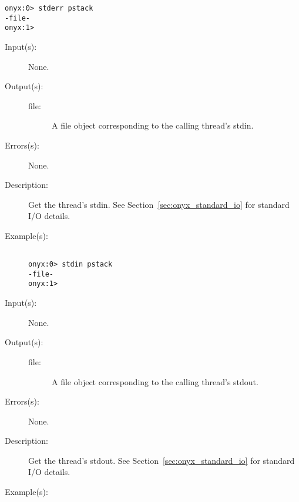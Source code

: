 \begin{description}
\begin{description}
\begin{verbatim}
onyx:0> stderr pstack
-file-
onyx:1>
		\end{verbatim}
	\end{description}
\label{systemdict:stdin}
\item[{\onyxop{--}{stdin}{file}}: ]
	\begin{description}\item[]
	\item[Input(s): ] None.
	\item[Output(s): ]
		\begin{description}\item[]
		\item[file: ]
			A file object corresponding to the calling thread's
			stdin.
		\end{description}
	\item[Errors(s): ] None.
	\item[Description: ]
		Get the thread's stdin.  See Section~\ref{sec:onyx_standard_io}
		for standard I/O details.
	\item[Example(s): ]\begin{verbatim}

onyx:0> stdin pstack
-file-
onyx:1>
		\end{verbatim}
	\end{description}
\label{systemdict:stdout}
\item[{\onyxop{--}{stdout}{file}}: ]
	\begin{description}\item[]
	\item[Input(s): ] None.
	\item[Output(s): ]
		\begin{description}\item[]
		\item[file: ]
			A file object corresponding to the calling thread's
			stdout.
		\end{description}
	\item[Errors(s): ] None.
	\item[Description: ]
		Get the thread's stdout.  See Section~\ref{sec:onyx_standard_io}
		for standard I/O details.
	\item[Example(s): ]\begin{verbatim}


\end{verbatim}
\end{description}
\end{description}
